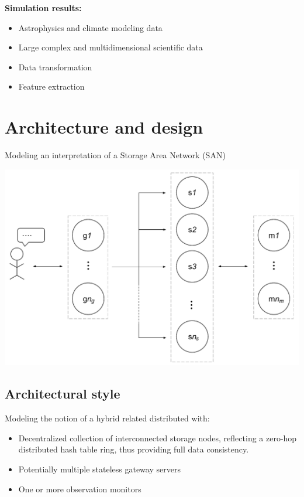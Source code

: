\documentclass[paper=128mm:96mm, fontsize=11pt, pagesize, parskip=half-,]{scrartcl}
\theoremstyle{definition}
\newenvironment{Figure}
  {\par\medskip\noindent\minipage{\linewidth}}
  {\endminipage\par\medskip}
\newcommand*{\newslide}{\clearpage}
\begin{document}
\textbf{Simulation results: }
\vspace*{-2mm}
\begin{itemize}
	\item Astrophysics and climate modeling data
	\item Large complex and multidimensional scientific data
	\item Data transformation
	\item Feature extraction
\end{itemize}
\newslide

\section{Architecture and design}
Modeling an interpretation of a Storage Area Network (SAN)
\begin{Figure}
	\centering\includegraphics[scale=0.38]{../Report/pdf/sofa-overview.pdf}
\end{Figure}
\newslide

\subsection{Architectural style}
Modeling the notion of a hybrid related distributed with:
\begin{itemize}
	\item Decentralized collection of interconnected storage nodes, reflecting a \newline zero-hop distributed hash table ring, thus providing full data consistency.
	\item Potentially multiple stateless gateway servers
	\item One or more observation monitors
\end{itemize}
\end{document}
